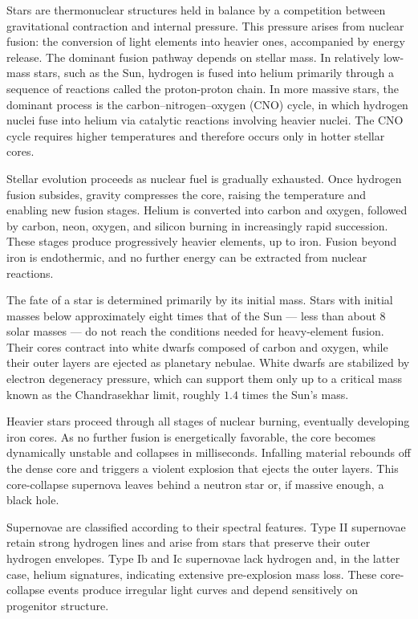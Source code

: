 Stars are thermonuclear structures held in balance by a competition between gravitational contraction and internal pressure. This pressure arises from nuclear fusion: the conversion of light elements into heavier ones, accompanied by energy release. The dominant fusion pathway depends on stellar mass. In relatively low-mass stars, such as the Sun, hydrogen is fused into helium primarily through a sequence of reactions called the proton-proton chain. In more massive stars, the dominant process is the carbon–nitrogen–oxygen (CNO) cycle, in which hydrogen nuclei fuse into helium via catalytic reactions involving heavier nuclei. The CNO cycle requires higher temperatures and therefore occurs only in hotter stellar cores.

Stellar evolution proceeds as nuclear fuel is gradually exhausted. Once hydrogen fusion subsides, gravity compresses the core, raising the temperature and enabling new fusion stages. Helium is converted into carbon and oxygen, followed by carbon, neon, oxygen, and silicon burning in increasingly rapid succession. These stages produce progressively heavier elements, up to iron. Fusion beyond iron is endothermic, and no further energy can be extracted from nuclear reactions.

The fate of a star is determined primarily by its initial mass. Stars with initial masses below approximately eight times that of the Sun — less than about $8$ solar masses — do not reach the conditions needed for heavy-element fusion. Their cores contract into white dwarfs composed of carbon and oxygen, while their outer layers are ejected as planetary nebulae. White dwarfs are stabilized by electron degeneracy pressure, which can support them only up to a critical mass known as the Chandrasekhar limit, roughly $1.4$ times the Sun’s mass.

Heavier stars proceed through all stages of nuclear burning, eventually developing iron cores. As no further fusion is energetically favorable, the core becomes dynamically unstable and collapses in milliseconds. Infalling material rebounds off the dense core and triggers a violent explosion that ejects the outer layers. This core-collapse supernova leaves behind a neutron star or, if massive enough, a black hole.

Supernovae are classified according to their spectral features. Type II supernovae retain strong hydrogen lines and arise from stars that preserve their outer hydrogen envelopes. Type Ib and Ic supernovae lack hydrogen and, in the latter case, helium signatures, indicating extensive pre-explosion mass loss. These core-collapse events produce irregular light curves and depend sensitively on progenitor structure.

